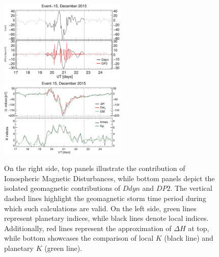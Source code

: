 \documentclass[a4paper,fleqn]{cas-dc}
\begin{document}
\begin{figure}[h!]
       \centerline{\Large \bf   
 	\hspace{0.26\textwidth}  \color{black}{}
 	\hspace{0.31\textwidth}  \color{black}{}
 	\hfill}
 \includegraphics[width=6.0cm]{images/diono/iono_PI_V1_2015-12-17.eps}
 \includegraphics[width=6.0cm]{images/dH_approx/diono_valid_V4_2015-12-17.eps}           
       \caption{On the right side, top panels illustrate the contribution of Ionospheric Magnetic Disturbances, while bottom panels depict the isolated geomagnetic contributions of $Ddyn$ and $DP2$. The vertical dashed lines highlight the geomagnetic storm time period during which such calculations are valid. On the left side, green lines represent planetary indices, while black lines denote local indices. Additionally, red lines represent the approximation of $\Delta H$ at top, while bottom showcases the comparison of local $K$ (black line) and planetary $K$ (green line).
       }
    \label{fig:iono_valid2}
\end{figure}
\end{document}
